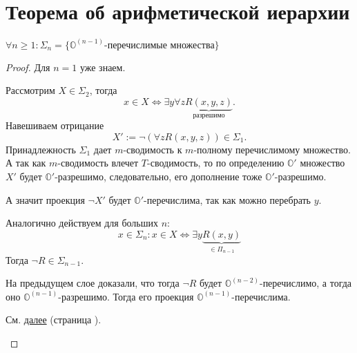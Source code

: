 \section{Теорема об арифметической иерархии}

\begin{thm}\label{thm:main_thm}
	$  \forall n \ge 1 \colon \Sigma _n = \{\mathbb{O}^{(n-1)} \text{-перечислимые множества}\}$
\end{thm}
\begin{proof}
    Для $ n = 1$ уже знаем.
	\begin{description}
	    \item \boxed{  \subset } 
			Рассмотрим $ X \in \Sigma _2$, тогда
			\[
				x \in X \Longleftrightarrow \exists y \forall z \underbrace{R(x, y,z)}_{ \text{разрешимо}}
			.\] 
			Навешиваем отрицание
			\[
				X' := \neg \left( \forall z R(x, y, z) \right)  \in \Sigma _1
			.\] 
			Принадлежность $  \Sigma _1$ дает $ m$-сводимость к $ m$-полному перечислимому множество. А так как $ m$-сводимость влечет $ T$-сводимость, то по определению $ \mathbb{O}'$ множество $ X'$ будет $ \mathbb{O}'$-разрешимо, следовательно, его дополнение тоже $ \mathbb{O}'$-разрешимо.

			А значит проекция $ \neg X'$ будет $ \mathbb{O}'$-перечислима, так как можно перебрать $ y$.

			Аналогично действуем для больших  $ n$: 
			\[ x \in \Sigma_n\colon x \in X \Longleftrightarrow \exists y \underbrace{R(x, y)}_{ \in \Pi _{n - 1}}\]
			Тогда $ \neg R \in \Sigma _{n-1} .$ 

		На предыдущем слое доказали, что тогда $ \neg R $ будет $ \mathbb{O}^{(n-2)}$-перечислимо, а тогда оно $ \mathbb{O}^{(n-1)}$-разрешимо. Тогда его проекция $ \mathbb{O}^{(n-1)}$-перечислима.
	    \item \boxed{\supset } 
			См. \hyperref[proof:main_thm]{далее} (страница \pageref{proof:main_thm}).
	\end{description} 
\end{proof}


